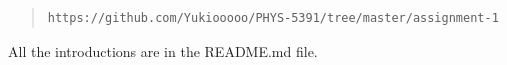 \documentclass[12pt, letterpaper]{article} %
\begin{document}
\begin{quote} 
\begin{verbatim}
https://github.com/Yukiooooo/PHYS-5391/tree/master/assignment-1
\end{verbatim} %
\end{quote} %

All the introductions are in the README.md file. 





\clearpage %

\end{document}
